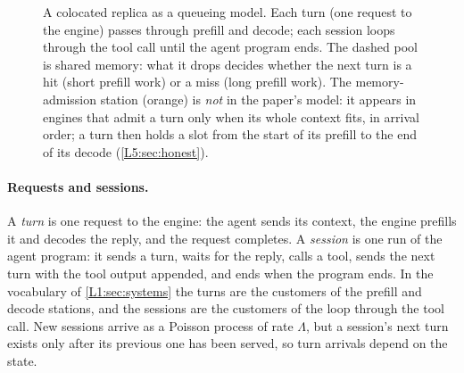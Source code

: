 \begin{figure}[t]
\caption{A colocated replica as a queueing model. Each turn (one request to the
engine) passes through prefill and decode; each session loops through the tool call
until the agent program ends. The
dashed pool is shared memory: what it drops decides whether the next turn is a hit
(short prefill work) or a miss (long prefill work). The memory-admission station
(orange) is \emph{not} in the paper's model: it appears in engines that admit a turn
only when its whole context fits, in arrival order; a turn then holds a slot from the
start of its prefill to the end of its decode (\cref{L5:sec:honest}).}
\label{fig:projection}
\end{figure}

\paragraph{Requests and sessions.} A \emph{turn} is one request to the engine: the
agent sends its context, the engine prefills it and decodes the reply, and the request
completes. A \emph{session} is one run of the agent program: it sends a turn, waits for
the reply, calls a tool, sends the next turn with the tool output appended, and ends
when the program ends. In the vocabulary of \cref{L1:sec:systems} the turns are the
customers of the prefill and decode stations, and the sessions are the customers of
the loop through the tool call. New
sessions arrive as a Poisson process of rate $\Lambda$, but a session's next turn exists
only after its previous one has been served, so turn arrivals depend on the state.

